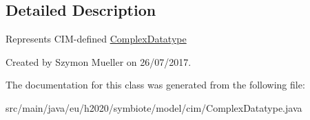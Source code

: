 \subsection{Detailed Description}
Represents C\+I\+M-\/defined \hyperlink{classeu_1_1h2020_1_1symbiote_1_1model_1_1cim_1_1ComplexDatatype}{Complex\+Datatype}

Created by Szymon Mueller on 26/07/2017. 

The documentation for this class was generated from the following file\+:\begin{DoxyCompactItemize}
\item 
src/main/java/eu/h2020/symbiote/model/cim/Complex\+Datatype.\+java\end{DoxyCompactItemize}
